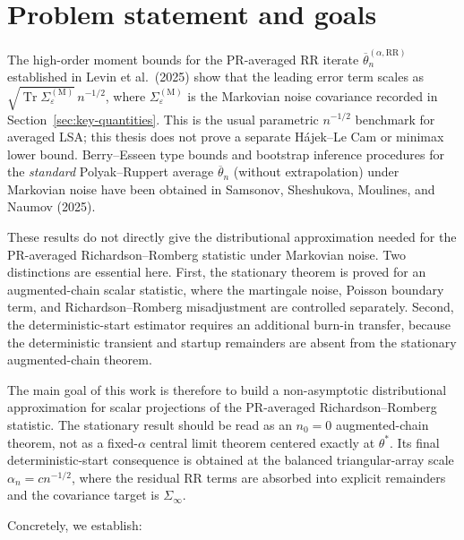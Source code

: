 \section{Problem statement and goals}

The high-order moment bounds for the PR-averaged RR iterate
$\overline{\theta}_n^{(\alpha,\mathrm{RR})}$ established in Levin et
al.\ (2025) show that the leading error term scales as
$\sqrt{\operatorname{Tr}\Sigma_\varepsilon^{(\mathrm{M})}}\,n^{-1/2}$,
where $\Sigma_\varepsilon^{(\mathrm{M})}$ is the Markovian noise covariance
recorded in Section~\ref{sec:key-quantities}. This is the usual parametric
$n^{-1/2}$ benchmark for averaged LSA; this thesis does not prove a separate
H\'ajek--Le Cam or minimax lower bound. Berry--Esseen type bounds and bootstrap
inference procedures for the \emph{standard} Polyak--Ruppert average
$\overline{\theta}_n$ (without extrapolation) under Markovian noise have been
obtained in Samsonov, Sheshukova, Moulines, and Naumov (2025).

These results do not directly give the distributional approximation needed for
the PR-averaged Richardson--Romberg statistic under Markovian noise. Two
distinctions are essential here. First, the stationary theorem is proved for an
augmented-chain scalar statistic, where the martingale noise, Poisson boundary
term, and Richardson--Romberg misadjustment are controlled separately. Second,
the deterministic-start estimator requires an additional burn-in transfer,
because the deterministic transient and startup remainders are absent from the
stationary augmented-chain theorem.

The main goal of this work is therefore to build a non-asymptotic
distributional approximation for scalar projections of the PR-averaged
Richardson--Romberg statistic. The stationary result should be read as an
$n_0=0$ augmented-chain theorem, not as a fixed-$\alpha$ central limit theorem
centered exactly at $\theta^*$. Its final deterministic-start consequence is
obtained at the balanced triangular-array scale $\alpha_n=cn^{-1/2}$, where
the residual RR terms are absorbed into explicit remainders and the covariance
target is $\Sigma_\infty$.

Concretely, we establish:

